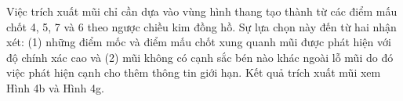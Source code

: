 \documentclass[journal]{IEEEtran}
\begin{document}
Việc trích xuất mũi chỉ cần dựa vào vùng hình thang tạo thành từ các điểm mấu chốt 4, 5, 7 và 6 theo ngược chiều kim đồng hồ. Sự lựa chọn này đến từ hai nhận xét: (1) những điểm mốc và điểm mấu chốt xung quanh mũi được phát hiện với độ chính xác cao và (2) mũi không có cạnh sắc bén nào khác ngoài lỗ mũi do đó việc phát hiện cạnh cho thêm thông tin giới hạn. Kết quả trích xuất mũi xem Hình 4b và Hình 4g.

\begin{figure}[!t]
\centering
{}

\end{figure}
\end{document}
